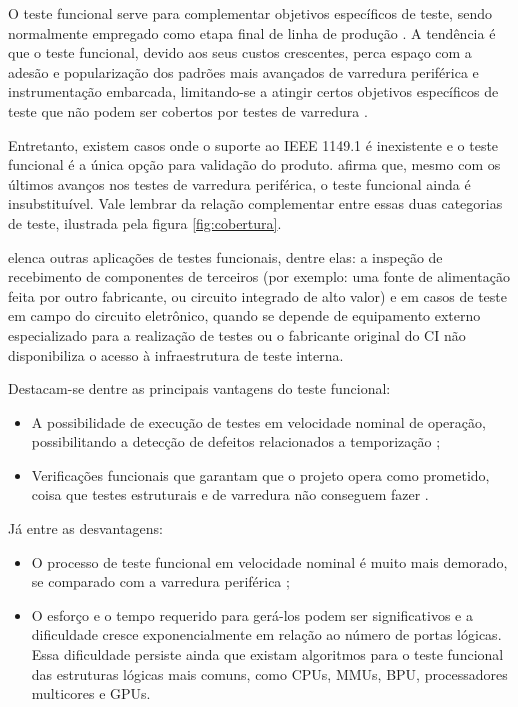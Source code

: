 O teste funcional serve para complementar objetivos específicos de teste, sendo normalmente empregado como etapa final de linha de produção \citep{thibeault2006,jutman2014high,tumim2001}. A tendência é que o teste funcional, devido aos seus custos crescentes, perca espaço com a adesão e popularização dos padrões mais avançados de varredura periférica e instrumentação embarcada, limitando-se a atingir certos objetivos específicos de teste que não podem ser cobertos por testes de varredura \citep{thibeault2006, thomaswenzelenricozimmermann2016}. 

Entretanto, existem casos onde o suporte ao IEEE 1149.1 é inexistente e o teste funcional é a única opção para validação do produto. \citet{tumim2001} afirma que, mesmo com os últimos avanços nos testes de varredura periférica, o teste funcional ainda é insubstituível. Vale lembrar da relação complementar entre essas duas categorias de teste, ilustrada pela figura \ref{fig:cobertura}. 

\citet{jutman2014high} elenca outras aplicações de testes funcionais, dentre elas: a inspeção de recebimento de componentes de terceiros (por exemplo: uma fonte de alimentação feita por outro fabricante, ou circuito integrado de alto valor) e em casos de teste em campo do circuito eletrônico, quando se depende de equipamento externo especializado para a realização de testes ou o fabricante original do CI não disponibiliza o acesso à infraestrutura de teste interna.


Destacam-se dentre as principais vantagens do teste funcional:
\begin{itemize}
    \item A possibilidade de execução de testes em velocidade nominal de operação, possibilitando a detecção de defeitos relacionados a temporização \citep{thibeault2006};  
    \item Verificações funcionais que garantam que o projeto opera como prometido,  coisa que testes estruturais e de varredura não conseguem fazer \citep{tumim2001}.
\end{itemize}

Já entre as desvantagens: 

\begin{itemize}
    \item O processo de teste funcional em velocidade nominal é muito mais demorado, se comparado com a varredura periférica \citep{thibeault2006}; 
    \item O esforço e o tempo requerido para gerá-los podem ser significativos e a dificuldade cresce exponencialmente em relação ao número de portas lógicas. Essa dificuldade persiste ainda que existam algoritmos para o teste funcional das estruturas lógicas mais comuns, como CPUs, MMUs, BPU, processadores multicores e GPUs.
\end{itemize}
 

